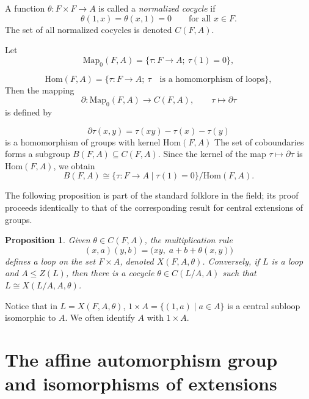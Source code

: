 \documentclass[12pt,a4paper]{amsart}
\newtheorem{proposition}[theorem]{Proposition}
\theoremstyle{definition}
\begin{document}
A function $\theta : F\times F \to A$ is called a \textit{normalized cocycle} if
\[
\theta(1,x)=\theta(x,1)=0 \qquad \text{for all } x\in F.
\]
The set of all normalized cocycles is denoted $C(F, A)$.

Let \[
\mathrm{Map}_{0}(F,A)=\{\tau:F\to A;\ \tau(1)=0\},
\]

\[
\mathrm{Hom}(F,A)=\{\tau:F\to A;\ \tau \quad \text{is a homomorphism of loops}\},
\]
 Then the mapping
\[
\partial \colon \mathrm{Map}_{0}(F,A) \to C(F,A), \qquad 
\tau \mapsto \partial{\tau}
\]
is defined by

\[
\partial{\tau}(x,y)=\tau(xy)-\tau(x)-\tau(y)
\]
is a homomorphism of groups with kernel $\mathrm{Hom}(F,A)$
The set of coboundaries forms a subgroup $B(F, A)\subseteq C(F, A)$. 
Since the kernel of the map $\tau\mapsto\partial{\tau}$ is $\mathrm{Hom}(F,A)$, we obtain
\[
B(F,A)\cong \{\tau:F\to A\mid\tau(1)=0\}/\mathrm{Hom}(F,A).
\]

The following proposition is part of the standard folklore in the field; its proof proceeds identically to that of the corresponding result for central extensions of groups.

\begin{proposition} \label{prop:cocycles}
Given $\theta\in C(F,A)$, the multiplication rule
\[
(x,a)(y,b)=\bigl(xy,\; a+b+\theta(x,y)\bigr)
\]
defines a loop on the set $F\times A$, denoted $X(F,A,\theta)$. Conversely, if $L$ is a loop and $A\leq Z(L)$, then there is a cocycle $\theta \in C(L/A,A)$ such that $L\cong X(L/A,A,\theta)$. 
\end{proposition}

Notice that in $L=X(F,A,\theta)$, $1\times A = \{(1,a) \mid a\in A\}$ is a central subloop isomorphic to $A$. We often identify $A$ with $1\times A$. 



\section{The affine automorphism group and isomorphisms of extensions}
\end{document}
